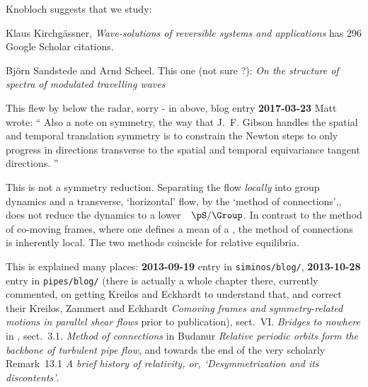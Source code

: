\begin{description}
{    }

 {
Knobloch suggests that we study:

Klaus Kirchg{\"a}ssner,
{\em Wave-solutions of reversible systems and applications} has
296 Google Scholar citations.

Bj{\"o}rn Sandstede and Arnd Scheel. This one (not sure ?):
{\em On the structure of spectra of modulated travelling waves}
    }

%

 {
This flew by below the radar, sorry - in  above, blog
entry {\bf 2017-03-23} Matt wrote:
``
Also a note on symmetry, the way that J.~F. Gibson
 handles the spatial and temporal
translation symmetry is to constrain the Newton steps to only progress in
directions transverse to the spatial and temporal equivariance tangent
directions.
''

This is not a symmetry reduction.
Separating the flow {\em locally} into group dynamics and a transverse,
`horizontal' flow, by the `method of
connections',, does not reduce the dynamics to a
lower\dmn\ \reducedsp\ $\pS/\Group$.
In contrast to the method of co-moving frames, where one defines a mean
{\phaseVel} of a \rpo, the method of connections is inherently local. The two
methods coincide for relative equilibria.

This is explained many places:
{\bf 2013-09-19} entry in
\texttt{siminos/blog/},
{\bf 2013-10-28}  entry in
\texttt{pipes/blog/} (there is actually a whole chapter there, currently commented,
on getting Kreilos and Eckhardt to understand that, and correct their
Kreilos, Zammert and Eckhardt
{\em Comoving frames and symmetry-related motions in parallel shear flows}
prior to publication),
sect.~VI. {\em Bridges to nowhere}  in ,
sect.~3.1.
{\em Method of connections} in Budanur \etal{}
{\em Relative periodic orbits form the backbone of turbulent pipe flow},
and towards the end of the very scholarly
 {Remark~13.1}
{\em A brief history of relativity,
or, `Desymmetrization and its discontents'}.

}
\end{description}
